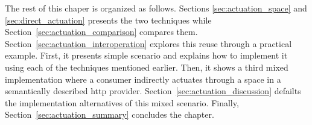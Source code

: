 The rest of this chaper is organized as follows.
Sections \ref{sec:actuation_space} and \ref{sec:direct_actuation} presents the two techniques while Section~\ref{sec:actuation_comparison} compares them.
Section~\ref{sec:actuation_interoperation} explores this reuse through a practical example. %
First, it presents simple scenario and explains how to implement it using each of the techniques mentioned earlier.
Then, it shows a third mixed implementation where a consumer indirectly actuates through a space in a semantically described \acs{http} provider. %
Section~\ref{sec:actuation_discussion} defailts the implementation alternatives of this mixed scenario.
Finally, Section~\ref{sec:actuation_summary} concludes the chapter.









